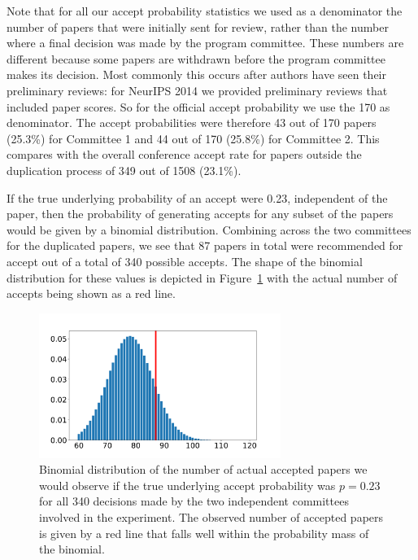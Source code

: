 Note that for all our accept probability statistics we used as a
denominator the number of papers that were initially sent for review,
rather than the number where a final decision was made by the program
committee. These numbers are different because some papers are withdrawn
before the program committee makes its decision. Most commonly this
occurs after authors have seen their preliminary reviews: for NeurIPS 2014
we provided preliminary reviews that included paper scores. So for the
official accept probability we use the 170 as denominator. The accept
probabilities were therefore 43 out of 170 papers (25.3\%) for Committee
1 and 44 out of 170 (25.8\%) for Committee 2. This compares with the
overall conference accept rate for papers outside the duplication
process of 349 out of 1508 (23.1\%).

If the true underlying probability of an accept were 0.23, independent
of the paper, then the probability of generating accepts for any subset
of the papers would be given by a binomial distribution. Combining
across the two committees for the duplicated papers, we see that 87
papers in total were recommended for accept out of a total of 340
possible accepts. The shape of the binomial distribution for these values is 
depicted in Figure~\ref{fig:uncertainty-accept-rate} with the actual number of accepts being shown as a red line.


\begin{figure}[htb]
\centering
\includegraphics[width=0.70\textwidth]{diagrams/neurips/uncertainty-accept-rate.pdf}


\caption{Binomial distribution of the number of actual accepted papers we would observe if the true underlying accept probability was $p=0.23$ for all 340 decisions made by the two independent committees involved in the experiment. The observed number of accepted papers is given by a red line that falls well within the probability mass of the binomial.}
\label{fig:uncertainty-accept-rate}
\end{figure}

